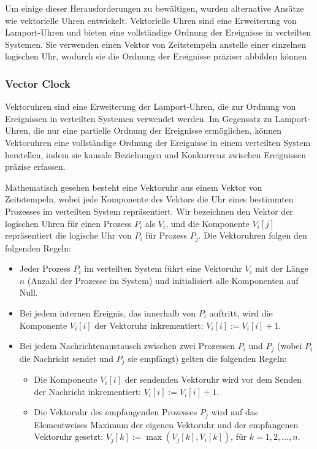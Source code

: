 Um einige dieser Herausforderungen zu bewältigen, wurden alternative Ansätze wie vektorielle Uhren entwickelt. Vektorielle Uhren sind eine Erweiterung von Lamport-Uhren und bieten eine vollständige Ordnung der Ereignisse in verteilten Systemen. Sie verwenden einen Vektor von Zeitstempeln anstelle einer einzelnen logischen Uhr, wodurch sie die Ordnung der Ereignisse präziser abbilden können

\subsubsection{Vector Clock}
Vektoruhren sind eine Erweiterung der Lamport-Uhren, die zur Ordnung von Ereignissen in verteilten Systemen verwendet werden. Im Gegensatz zu Lamport-Uhren, die nur eine partielle Ordnung der Ereignisse ermöglichen, können Vektoruhren eine vollständige Ordnung der Ereignisse in einem verteilten System herstellen, indem sie kausale Beziehungen und Konkurrenz zwischen Ereignissen präzise erfassen.

Mathematisch gesehen besteht eine Vektoruhr aus einem Vektor von Zeitstempeln, wobei jede Komponente des Vektors die Uhr eines bestimmten Prozesses im verteilten System repräsentiert. Wir bezeichnen den Vektor der logischen Uhren für einen Prozess $P_i$ als $V_i$, und die Komponente $V_i[j]$ repräsentiert die logische Uhr von $P_i$ für Prozess $P_j$. Die Vektoruhren folgen den folgenden Regeln:

\begin{itemize}
\item Jeder Prozess $P_i$ im verteilten System führt eine Vektoruhr $V_i$ mit der Länge $n$ (Anzahl der Prozesse im System) und initialisiert alle Komponenten auf Null.

\item Bei jedem internen Ereignis, das innerhalb von $P_i$ auftritt, wird die Komponente $V_i[i]$ der Vektoruhr inkrementiert: $V_i[i] := V_i[i] + 1$.

\item Bei jedem Nachrichtenaustausch zwischen zwei Prozessen $P_i$ und $P_j$ (wobei $P_i$ die Nachricht sendet und $P_j$ sie empfängt) gelten die folgenden Regeln:
\begin{itemize}
\item Die Komponente $V_i[i]$ der sendenden Vektoruhr wird vor dem Senden der Nachricht inkrementiert: $V_i[i] := V_i[i] + 1$.
\item Die Vektoruhr des empfangenden Prozesses $P_j$ wird auf das Elementweises Maximum der eigenen Vektoruhr und der empfangenen Vektoruhr gesetzt: $V_j[k] := \max(V_j[k], V_i[k])$, für $k = 1, 2, \dots, n$.
\end{itemize}
\end{itemize}	

